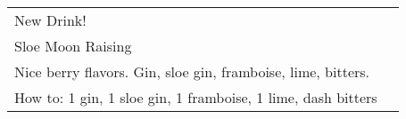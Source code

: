 \documentclass[12pt]{article}
\makeatletter
\newcommand*\ColText[1]{\textcolor{DarkColor}{#1}}
\newenvironment{Group}[1]
  {\noindent\begin{tabular*}{\textwidth}{@{}p{.8\linewidth}@{\extracolsep{\fill}}r@{}}
    {\fontsize{24}{29}\selectfont\ColText{#1}}\\[0.8em]}
  {\end{tabular*}}
\newcommand*\Entry[1]{%
  \sffamily#1 \\
}
\newcommand*\Expl[1]{
  \hspace*{1em}\footnotesize #1 \\
}
\newcommand*\HowTo[1]{
  \hspace*{1em}\footnotesize How to: \hspace*{1em}#1 \\
}
\makeatother
\begin{document}
\begin{Group}{New Drink!}
\Entry{Sloe Moon Raising}
\Expl{Nice berry flavors. Gin, sloe gin, framboise, lime, bitters.}
\HowTo{1 gin, 1 sloe gin, 1 framboise, 1 lime, dash bitters}
\end{Group}
\vfill

%

%


\vfill

%


\end{document}

